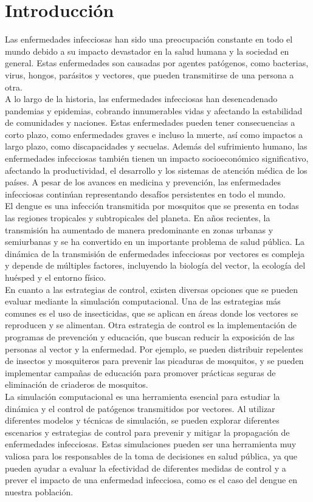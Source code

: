 \chapter*{Introducción}\label{chapter:introduction}
Las enfermedades infecciosas han sido una preocupación constante en todo el mundo debido 
a su impacto devastador en la salud humana y la sociedad en general. Estas enfermedades 
son causadas por agentes patógenos, como bacterias, virus, hongos, parásitos y vectores, que pueden 
transmitirse de una persona a otra. \\
A lo largo de la historia, las enfermedades infecciosas 
han desencadenado pandemias y epidemias, cobrando innumerables vidas y afectando la estabilidad 
de comunidades y naciones. Estas enfermedades pueden tener consecuencias a corto plazo, como 
enfermedades graves e incluso la muerte, así como impactos a largo plazo, como discapacidades y 
secuelas. Además del sufrimiento humano, las enfermedades infecciosas también tienen un impacto 
socioeconómico significativo, afectando la productividad, el desarrollo y los sistemas de atención 
médica de los países. A pesar de los avances en medicina y prevención, las enfermedades infecciosas 
continúan representando desafíos persistentes en todo el mundo. \\
El dengue es una infección transmitida por mosquitos que se presenta en todas
las regiones tropicales y subtropicales del planeta. En años recientes, la transmisión
ha aumentado de manera predominante en zonas urbanas y semiurbanas y se ha convertido 
en un importante problema de salud pública. La dinámica de la transmisión
de enfermedades infecciosas por vectores es compleja y depende de múltiples factores, 
incluyendo la biología del vector, la ecología del huésped y el entorno físico. \\ 
En cuanto a las estrategias de control, existen diversas opciones que se pueden
evaluar mediante la simulación computacional. Una de las estrategias más comunes es
el uso de insecticidas, que se aplican en áreas donde los vectores se reproducen y se
alimentan. Otra estrategia de control es la implementación de programas de prevención y
educación, que buscan reducir la exposición de las personas al vector y la enfermedad.
Por ejemplo, se pueden distribuir repelentes de insectos y mosquiteros para prevenir
las picaduras de mosquitos, y se pueden implementar campañas de educación para
promover prácticas seguras de eliminación de criaderos de mosquitos. \autocite{Gubler1995}\\
La simulación computacional es una herramienta esencial para estudiar la dinámica y 
el control de patógenos transmitidos por vectores. Al utilizar diferentes modelos
y técnicas de simulación, se pueden explorar diferentes escenarios y estrategias de
control para prevenir y mitigar la propagación de enfermedades infecciosas. Estas 
simulaciones pueden ser una herramienta muy valiosa para los responsables de la toma
de decisiones en salud pública, ya que pueden ayudar a evaluar la efectividad de 
diferentes medidas de control y a prever el impacto de una enfermedad infecciosa, como
es el caso del dengue en nuestra población.\\

